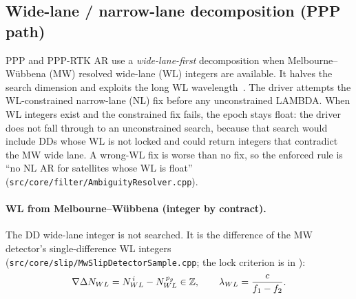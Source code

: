 \documentclass[main.tex]{subfiles}
\begin{document}
\subsection{Wide-lane / narrow-lane decomposition (PPP
path)}\label{sec:ar-wlnl}

PPP and PPP-RTK AR use a \emph{wide-lane-first} decomposition when
Melbourne--W\"ubbena (MW) resolved wide-lane (WL) integers are
available.  It halves the search dimension and exploits the long WL
wavelength~\cite{laurichesse2009integer}.  The driver attempts the
WL-constrained narrow-lane (NL) fix before any unconstrained
\textsc{LAMBDA}.  When WL integers exist and the constrained fix fails,
the epoch stays float: the driver does not fall through to an
unconstrained search, because that search would include DDs whose WL is
not locked and could return integers that contradict the MW wide lane.
A wrong-WL fix is worse than no fix, so the enforced rule is ``no NL AR
for satellites whose WL is float''
(\texttt{src/core/filter/AmbiguityResolver.cpp}).

\paragraph{WL from Melbourne--W\"ubbena (integer by contract).}
The DD wide-lane integer is not searched.  It is the difference of the
MW detector's single-difference WL integers
(\texttt{src/core/slip/MwSlipDetectorSample.cpp}; the lock criterion is in
):
\begin{equation}
\nabla\Delta N_{WL} = N^{\,i}_{WL} - N^{\,p_{g}}_{WL}
  \in \mathbb{Z},
\qquad
\lambda_{WL} = \frac{c}{f_1 - f_2}.
\label{eq:dd-wl}
\end{equation}
\end{document}

